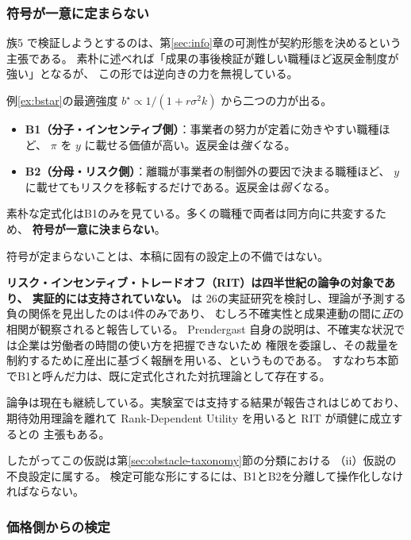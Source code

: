 \subsubsection{符号が一意に定まらない}
\label{sec:predB-illposed}

族5 で検証しようとするのは、第\ref{sec:info}章の可測性が契約形態を決めるという主張である。
素朴に述べれば「成果の事後検証が難しい職種ほど返戻金制度が強い」となるが、
この形では逆向きの力を無視している。

例\ref{ex:bstar}の最適強度 $b^\star \propto 1/(1+r\sigma^2 k)$ から二つの力が出る。

\begin{itemize}
\item \textbf{B1（分子・インセンティブ側）}：事業者の努力が定着に効きやすい職種ほど、
$\pi$ を $y$ に載せる価値が高い。返戻金は\emph{強く}なる。
\item \textbf{B2（分母・リスク側）}：離職が事業者の制御外の要因で決まる職種ほど、
$y$ に載せてもリスクを移転するだけである。返戻金は\emph{弱く}なる。
\end{itemize}

素朴な定式化はB1のみを見ている。多くの職種で両者は同方向に共変するため、
\textbf{符号が一意に決まらない}。

\begin{remark}[これは分野全体の未解決問題である]
符号が定まらないことは、本稿に固有の設定上の不備ではない。

\textbf{リスク・インセンティブ・トレードオフ（RIT）は四半世紀の論争の対象であり、
実証的には支持されていない。} \cite{prendergast1999,prendergast2002} は
26の実証研究を検討し、理論が予測する負の関係を見出したのは4件のみであり、
むしろ不確実性と成果連動の間に\emph{正}の相関が観察されると報告している。
Prendergast 自身の説明は、不確実な状況では企業は労働者の時間の使い方を把握できないため
権限を委譲し、その裁量を制約するために産出に基づく報酬を用いる、というものである。
すなわち本節でB1と呼んだ力は、既に定式化された対抗理論として存在する。

論争は現在も継続している。実験室では支持する結果が報告されはじめており、
期待効用理論を離れて Rank-Dependent Utility を用いると RIT が頑健に成立するとの
主張もある。

したがってこの仮説は第\ref{sec:obstacle-taxonomy}節の分類における
（ii）仮説の不良設定に属する。
検定可能な形にするには、B1とB2を分離して操作化しなければならない。
\end{remark}

\subsubsection{価格側からの検定}
\label{sec:what-to-measure}


